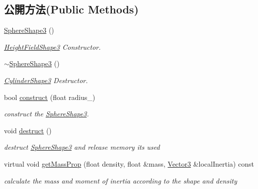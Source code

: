 \subsection*{公開方法(Public Methods)}
\begin{DoxyCompactItemize}
\item 
\hyperlink{class_magnum_1_1_sphere_shape3_ab6d90a67d60cc8de4bb370e8b9c1dfbf}{Sphere\+Shape3} ()
\begin{DoxyCompactList}\small\item\em \hyperlink{class_magnum_1_1_height_field_shape3}{Height\+Field\+Shape3} Constructor. \end{DoxyCompactList}\item 
\hyperlink{class_magnum_1_1_sphere_shape3_a6355fb0798b10b91dd7e7fce4ccf5caa}{$\sim$\+Sphere\+Shape3} ()
\begin{DoxyCompactList}\small\item\em \hyperlink{class_magnum_1_1_cylinder_shape3}{Cylinder\+Shape3} Destructor. \end{DoxyCompactList}\item 
bool \hyperlink{class_magnum_1_1_sphere_shape3_a865dbf5803d524443d710c9326c18f33}{construct} (float radius\+\_\+)
\begin{DoxyCompactList}\small\item\em construct the \hyperlink{class_magnum_1_1_sphere_shape3}{Sphere\+Shape3}. \end{DoxyCompactList}\item 
void \hyperlink{class_magnum_1_1_sphere_shape3_a9fd6c7f9fc7abc9deb1e87331586b1cd}{destruct} ()\hypertarget{class_magnum_1_1_sphere_shape3_a9fd6c7f9fc7abc9deb1e87331586b1cd}{}\label{class_magnum_1_1_sphere_shape3_a9fd6c7f9fc7abc9deb1e87331586b1cd}

\begin{DoxyCompactList}\small\item\em destruct \hyperlink{class_magnum_1_1_sphere_shape3}{Sphere\+Shape3} and release memory its used \end{DoxyCompactList}\item 
virtual void \hyperlink{class_magnum_1_1_sphere_shape3_a6588ac697b663d9318883c8783e76fa6}{get\+Mass\+Prop} (float density, float \&mass, \hyperlink{class_magnum_1_1_vector3}{Vector3} \&local\+Inertia) const 
\begin{DoxyCompactList}\small\item\em calculate the mass and moment of inertia according to the shape and density \end{DoxyCompactList}\end{DoxyCompactItemize}
